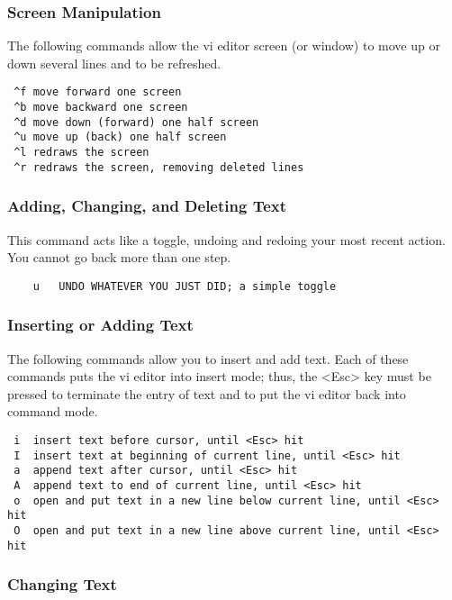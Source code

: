 \subsubsection{Screen Manipulation}

The following commands allow the vi editor screen (or window) to move up or down several lines and to be refreshed.

\begin{lstlisting}
 ^f	move forward one screen
 ^b	move backward one screen
 ^d	move down (forward) one half screen
 ^u	move up (back) one half screen
 ^l	redraws the screen
 ^r	redraws the screen, removing deleted lines
\end{lstlisting}


\subsubsection{Adding, Changing, and Deleting Text}

This command acts like a toggle, undoing and redoing your most recent action. 
You cannot go back more than one step.

\begin{lstlisting}
	u	UNDO WHATEVER YOU JUST DID; a simple toggle
\end{lstlisting}

\subsubsection{Inserting or Adding Text}

The following commands allow you to insert and add text. 
Each of these commands puts the vi editor into insert mode; thus, the <Esc> key must be pressed to terminate the entry of text and to put the vi editor 
back into command mode.

\begin{lstlisting}
 i	insert text before cursor, until <Esc> hit
 I	insert text at beginning of current line, until <Esc> hit
 a	append text after cursor, until <Esc> hit
 A	append text to end of current line, until <Esc> hit
 o	open and put text in a new line below current line, until <Esc> hit
 O	open and put text in a new line above current line, until <Esc> hit
\end{lstlisting}


\subsubsection{Changing Text}

